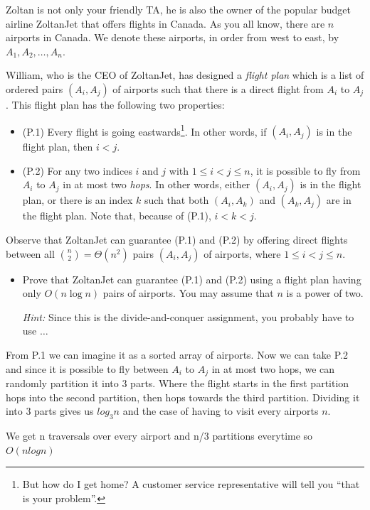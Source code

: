 \documentclass[12pt]{article}
\newcounter{ques}
\newenvironment{question}{\stepcounter{ques}{\noindent\bf Question \arabic{ques}:}}{\vspace{5mm}}
\newenvironment{solution}{{\noindent\bf Solution:}}{\vspace{5mm}}
\begin{document}
\begin{question} 
Zoltan is not only your friendly TA, he is also the owner of the popular 
budget airline ZoltanJet that offers flights in Canada. As you all know, 
there are $n$ airports in Canada. We denote these airports, in order from 
west to east, by $A_1,A_2,\ldots,A_n$. 

William, who is the CEO of ZoltanJet, has designed a \emph{flight plan} 
which is a list of ordered pairs $(A_i,A_j)$ of airports such that there 
is a direct flight from $A_i$ to $A_j$. This flight plan has the 
following two properties: 
\begin{itemize}
\item (P.1) Every flight is going 
      eastwards\footnote{But how do I get home? A customer service 
      representative will tell you ``that is your problem''.}. 
      In other words, if $(A_i,A_j)$ is in the flight plan, then $i<j$. 
\item (P.2) For any two indices $i$ and $j$ with $1 \leq i < j \leq n$, 
      it is possible to fly from $A_i$ to $A_j$ in at most two 
      \emph{hops}. In other words, either $(A_i,A_j)$ is in the flight 
      plan, or there is an index $k$ such that both $(A_i,A_k)$ and 
      $(A_k,A_j)$ are in the flight plan. Note that, because of (P.1), 
      $i < k < j$. 
\end{itemize}
Observe that ZoltanJet can guarantee (P.1) and (P.2) by offering 
direct flights between all ${n \choose 2} = \Theta(n^2)$ pairs 
$(A_i,A_j)$ of airports, where $1 \leq i < j \leq n$. 

\begin{itemize}
\item  
\noindent
Prove that ZoltanJet can guarantee (P.1) and (P.2) using a flight plan 
having only $O(n \log n)$ pairs of airports. You may assume that $n$ is a 
power of two.  

\noindent \emph{Hint:} Since this is the divide-and-conquer assignment, 
you probably have to use $\ldots$
\end{itemize}

\begin{solution}
      
      From P.1 we can imagine it as a sorted array of airports. 
      Now we can take P.2 and since it is possible to fly between 
      $A_i$ to $A_j$ in at most two hops, we can randomly partition it into 3 parts.
      Where the flight starts in the first partition hops into the second partition,
      then hops towards the third partition. Dividing it into 3 parts gives us
      $log_3 n$ and the case of having to visit every airports $n$.
      
      We get n traversals over every airport and n/3 partitions everytime so $O(nlogn)$ 


\end{solution}

\end{question}
\end{document}
